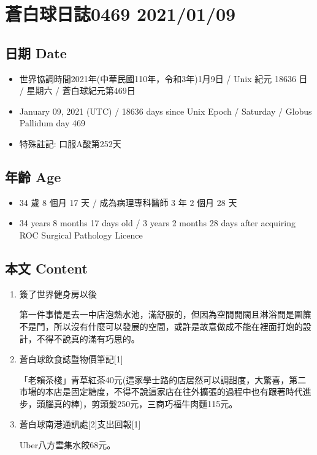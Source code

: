 \documentclass[a5paper, 10pt
]{book}
\providecommand{\tightlist}{%
  \setlength{\itemsep}{0pt}\setlength{\parskip}{0pt}}
\begin{document}
\hypertarget{ux84bcux767dux7403ux65e5ux8a8c0469-20210109}{%
\section{蒼白球日誌0469
2021/01/09}\label{ux84bcux767dux7403ux65e5ux8a8c0469-20210109}}

\hypertarget{ux65e5ux671f-date-39}{%
\subsection{日期 Date}\label{ux65e5ux671f-date-39}}

\begin{itemize}
\tightlist
\item
  世界協調時間2021年(中華民國110年，令和3年)1月9日 / Unix 紀元 18636 日
  / 星期六 / 蒼白球紀元第469日
\item
  January 09, 2021 (UTC) / 18636 days since Unix Epoch / Saturday /
  Globus Pallidum day 469
\item
  特殊註記: 口服A酸第252天
\end{itemize}

\hypertarget{ux5e74ux9f61-age-39}{%
\subsection{年齡 Age}\label{ux5e74ux9f61-age-39}}

\begin{itemize}
\tightlist
\item
  34 歲 8 個月 17 天 / 成為病理專科醫師 3 年 2 個月 28 天
\item
  34 years 8 months 17 days old / 3 years 2 months 28 days after
  acquiring ROC Surgical Pathology Licence
\end{itemize}

\hypertarget{ux672cux6587-content-39}{%
\subsection{本文 Content}\label{ux672cux6587-content-39}}

\begin{enumerate}
\def\labelenumi{\arabic{enumi}.}
\item
  簽了世界健身房以後

  第一件事情是去一中店泡熱水池，滿舒服的，但因為空間開闊且淋浴間是圍簾不是門，所以沒有什麼可以發展的空間，或許是故意做成不能在裡面打炮的設計，不得不說真的滿有巧思的。
\item
  蒼白球飲食誌暨物價筆記{[}1{]}

  「老賴茶棧」青草紅茶40元(這家學士路的店居然可以調甜度，大驚喜，第二市場的本店是固定糖度，不得不說這家店在往外擴張的過程中也有跟著時代進步，頭腦真的棒)，剪頭髮250元，三商巧福牛肉麵115元。
\item
  蒼白球南港通訊處{[}2{]}支出回報{[}1{]}

  Uber八方雲集水餃68元。
\end{enumerate}
\end{document}
